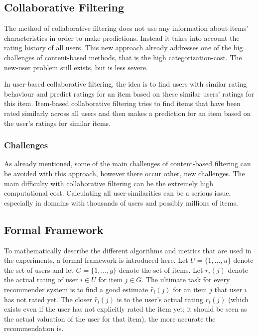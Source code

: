 \subsection{Collaborative Filtering}
\label{sst:collaborativefiltering} The method of collaborative filtering does not use any information about items' characteristics in order to make predictions. Instead it takes into account the rating history of all users. This new approach already addresses one of the big challenges of content-based methods, that is the high categorization-cost. The new-user problem still exists, but is less severe.

In user-based collaborative filtering, the idea is to find users with similar rating behaviour and predict ratings for an item based on these similar users' ratings for this item. Item-based collaborative filtering tries to find items that have been rated similarly across all users and then makes a prediction for an item based on the user's ratings for similar items.

\subsubsection{Challenges}
\label{ssst:challengescf} As already mentioned, some of the main challenges of content-based filtering can be avoided with this approach, however there occur other, new challenges. The main difficulty with collaborative filtering can be the extremely high computational cost. Calculating all user-similarities can be a serious issue, especially in domains with thousands of users and possibly millions of items.

\subsection{Formal Framework}
\label{ssst:formalframework} To mathematically describe the different algorithms and metrics that are used in the experiments, a formal framework is introduced here. Let $U = \{1,...,u\}$ denote the set of users and let $G = \{1,...,g\}$ denote the set of items. Let $r_i(j)$ denote the actual rating of user $i \in U$ for item $j \in G$. The ultimate task for every recommender system is to find a good estimate $\hat{r}_i(j)$ for an item $j$ that user $i$ has not rated yet. The closer $\hat{r}_i(j)$ is to the user's actual rating $r_i(j)$ (which exists even if the user has not explicitly rated the item yet; it should be seen as the actual valuation of the user for that item), the more accurate the recommendation is.

